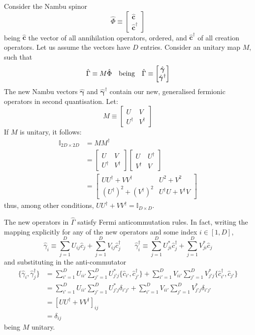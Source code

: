 Consider the Nambu spinor
\[
	\hat \Phi \equiv \begin{bmatrix}
		\hat{\mathbf{c}} \\ \hat{\mathbf{c}}^\dagger
	\end{bmatrix}
\]
being $\hat{\mathbf{c}}$ the vector of all annihilation operators, ordered, and $\hat{\mathbf{c}}^\dagger$ of all creation operators. Let us assume the vectors have $D$ entries. Consider an unitary map $M$, such that
\[
	\hat \Gamma \equiv M \hat \Phi
	\qq{being}
	\hat \Gamma \equiv \begin{bmatrix}
		\hat{\bm{\gamma}} \\ \hat{\bm{\gamma}}^\dagger
	\end{bmatrix}
\]
The new Nambu vectors $\hat{\bm{\gamma}}$ and $\hat{\bm{\gamma}}^\dagger$ contain our new, generalised fermionic operators in second quantisation. Let:
\[
	M \equiv \begin{bmatrix}
		U & V \\ U^\dagger & V^\dagger
	\end{bmatrix}
\]
If $M$ is unitary, it follows:
\[
\begin{aligned}
	\mathbb{I}_{2D \times 2D} &= MM^\dagger \\
	&= \begin{bmatrix}
		U & V \\ U^\dagger & V^\dagger
	\end{bmatrix} \begin{bmatrix}
		U & U^\dagger \\ V^\dagger & V
	\end{bmatrix} \\
	&= \begin{bmatrix}
		UU^\dagger + VV^\dagger & U^2 + V^2 \\
		\left(U^\dagger\right)^2 + \left(V^\dagger\right)^2 & U^\dagger U + V^\dagger V
	\end{bmatrix}
\end{aligned}
\]
thus, among other conditions, $UU^\dagger + VV^\dagger = \mathbb{I}_{D \times D}$.

The new operators in $\hat \Gamma$ satisfy Fermi anticommutation rules. In fact, writing the mapping explicitly for any of the new operators and some index $i \in [1,D]$,
\[
	\hat \gamma_i \equiv \sum_{j=1}^D U_{ij} \hat c_j + \sum_{j=1}^D V_{ij} \hat c_j^\dagger
	\qquad
	\hat \gamma_i^\dagger \equiv \sum_{j=1}^D U_{ji}^* \hat c_j^\dagger + \sum_{j=1}^D V_{ji}^* \hat c_j
\]
and substituting in the anti-commutator 
\[
\begin{aligned}
	\lbrace \hat \gamma_i, \hat \gamma_j^\dagger \rbrace &= \sum_{i'=1}^D U_{ii'} \sum_{j'=1}^D U_{j'j}^* \lbrace \hat c_{i'}, \hat c_{j'}^\dagger \rbrace + \sum_{i'=1}^D V_{ii'} \sum_{j'=1}^D V_{j'j}^* \lbrace \hat c_{i'}^\dagger, \hat c_{j'} \rbrace \\
	&= \sum_{i'=1}^D U_{ii'} \sum_{j'=1}^D U_{j'j}^* \delta_{i'j'} + \sum_{i'=1}^D V_{ii'} \sum_{j'=1}^D V_{j'j}^* \delta_{i'j'}\\
	&= \left[ UU^\dagger+VV^\dagger \right]_{ij} \\
	&= \delta_{ij}
\end{aligned}
\]
being $M$ unitary.

